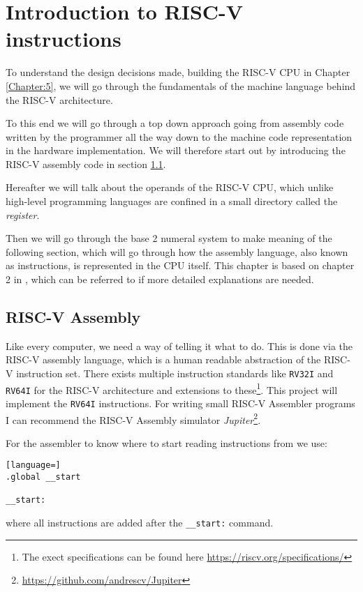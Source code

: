 \chapter{Introduction to RISC-V instructions}
    To understand the design decisions made, building the RISC-V CPU in Chapter \ref{Chapter:5}, we will go through the fundamentals of the machine language behind the RISC-V architecture. 
    
    To this end we will go through a top down approach going from assembly code written by the programmer all the way down to the machine code representation in the hardware implementation. We will therefore start out by introducing the RISC-V assembly code in section \ref{section:RISC-V Asembly}. 
    
    Hereafter we will talk about the operands of the RISC-V CPU, which unlike high-level programming languages are confined in a small directory called the \textit{register}. 
    
    Then we will go through the base 2 numeral system to make meaning of the following section, which will go through how the assembly language, also known as instructions, is represented in the CPU itself. This chapter is based on chapter 2 in \cite{riscVbook}, which can be referred to if more detailed explanations are needed.

\section{RISC-V Assembly}\label{section:RISC-V Asembly}
    Like every computer, we need a way of telling it what to do. This is done via the RISC-V assembly language, which is a human readable abstraction of the RISC-V instruction set. There exists multiple instruction standards like \texttt{RV32I} and \texttt{RV64I} for the RISC-V architecture and extensions to these\footnote{The exect specifications can be found here \url{https://riscv.org/specifications/}}. This project will implement the \texttt{RV64I} instructions. For writing small RISC-V Assembler programs I can recommend the RISC-V Assembly simulator \textit{Jupiter}\footnote{\url{https://github.com/andrescv/Jupiter}}.
    
    For the assembler to know where to start reading instructions from we use:
    
    \begin{lstlisting}[language=]
.global __start

__start:
    \end{lstlisting}
    where all instructions are added after the \texttt{\_\_start:} command.
    
